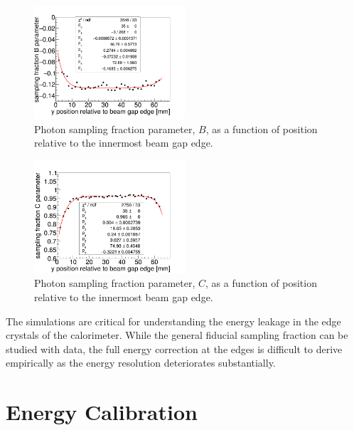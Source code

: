 \documentclass[twoside]{article}
\begin{document}
\begin{multicols}{2}
\begin{figure}[H]
  \centering
      \includegraphics[width=0.5\textwidth]{pics/p0_p.png}
  \caption{Photon sampling fraction parameter, $B$, as a function of position relative to the innermost beam gap edge.}
  \label{p1_p}
\end{figure} 

\begin{figure}[H]
  \centering
      \includegraphics[width=0.5\textwidth]{pics/p1_p.png}
  \caption{Photon sampling fraction parameter, $C$, as a function of position relative to the innermost beam gap edge.}
  \label{p2_p}
\end{figure} 

The simulations are critical for understanding the energy leakage in the edge crystals of the calorimeter. While the general fiducial sampling fraction can be studied with data, the full energy correction at the edges is difficult to derive empirically as the energy resolution deteriorates substantially.



\section{Energy Calibration}


\end{multicols}
\end{document}
